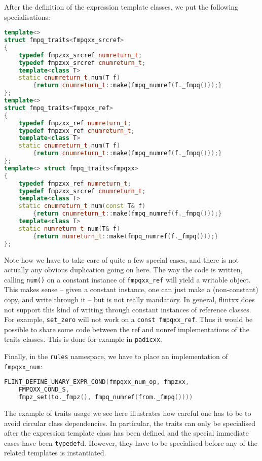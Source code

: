 \documentclass[a4paper,10pt]{book}
\newcommand{\code}{\lstinline}
\begin{document}
{{After the definition of the expression template classes, we put the following
specialisations:

\begin{lstlisting}[language=c++]
template<>
struct fmpq_traits<fmpqxx_srcref>
{
    typedef fmpzxx_srcref numreturn_t;
    typedef fmpzxx_srcref cnumreturn_t;
    template<class T>
    static cnumreturn_t num(T f)
        {return cnumreturn_t::make(fmpq_numref(f._fmpq()));}
};
template<>
struct fmpq_traits<fmpqxx_ref>
{
    typedef fmpzxx_ref numreturn_t;
    typedef fmpzxx_ref cnumreturn_t;
    template<class T>
    static cnumreturn_t num(T f)
        {return cnumreturn_t::make(fmpq_numref(f._fmpq()));}
};
template<> struct fmpq_traits<fmpqxx>
{
    typedef fmpzxx_ref numreturn_t;
    typedef fmpzxx_srcref cnumreturn_t;
    template<class T>
    static cnumreturn_t num(const T& f)
        {return cnumreturn_t::make(fmpq_numref(f._fmpq()));}
    template<class T>
    static numreturn_t num(T& f)
        {return numreturn_t::make(fmpq_numref(f._fmpq()));}
};
\end{lstlisting}

Note how we have to take care of quite a few special cases, and there is not
actually any obvious duplication going on here. The way the code is written,
calling \code{num()} on a constant instance of \code{fmpqxx_ref} will yield a
writable object. This makes sense -- given a constant instance, one can just
make a (non-constant) copy, and write through it -- but is not really mandatory.
In
general, flintxx does not support this kind of writing through constant
instances of reference classes.
For example, \code{set_zero} will not work on a \code{const fmpqxx_ref}.
Thus it would be possible to share some code between the ref and
nonref implementations of the traits classes. This is done for example in
\code{padicxx}.

Finally, in the \code{rules} namespace, we have to place an implementation of
\code{fmpqxx_num}:

\begin{lstlisting}[language=c++]
FLINT_DEFINE_UNARY_EXPR_COND(fmpqxx_num_op, fmpzxx,
    FMPQXX_COND_S,
    fmpz_set(to._fmpz(), fmpq_numref(from._fmpq())))
\end{lstlisting}

The example of traits usage we see here illustrates how careful one has to be to
avoid circular class dependencies. In particular, the traits can only be
specialised after the expression template class has been defined and the special
immediate cases have been \code{typedef}d. However, they have to be specialised
before any of the related templates is instantiated.

}}
\end{document}
